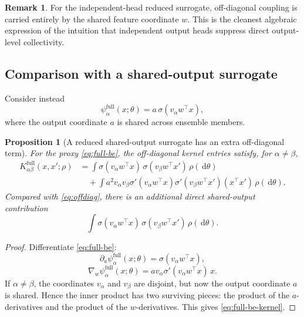 \documentclass[11pt]{article}
\newtheorem{proposition}[theorem]{Proposition}
\theoremstyle{definition}
\newtheorem{remark}[theorem]{Remark}
\newcommand{\dd}{\,\mathrm{d}}
\begin{document}
\begin{remark}
For the independent-head reduced surrogate, off-diagonal coupling is carried entirely by the shared feature coordinate $w$.
This is the cleanest algebraic expression of the intuition that independent output heads suppress direct output-level collectivity.
\end{remark}

\subsection{Comparison with a shared-output surrogate}

Consider instead
\begin{equation}
  \psi_\alpha^{\mathrm{full}}(x;\theta)
  =
  a\, \sigma(v_\alpha w^\top x),
  \label{eq:full-be}
\end{equation}
where the output coordinate $a$ is shared across ensemble members.

\begin{proposition}[A reduced shared-output surrogate has an extra off-diagonal term]
\label{prop:shared-output}
For the proxy \eqref{eq:full-be}, the off-diagonal kernel entries satisfy, for $\alpha\neq\beta$,
\begin{align}
  K^{\mathrm{full}}_{\alpha\beta}(x,x';\rho)
  &=
  \int
  \sigma(v_\alpha w^\top x)\,
  \sigma(v_\beta w^\top x')
  \,\rho(\dd \theta)
  \nonumber\\
  &\quad
  +
  \int
  a^2 v_\alpha v_\beta
  \sigma'(v_\alpha w^\top x)\sigma'(v_\beta w^\top x')
  (x^\top x')
  \,\rho(\dd \theta).
  \label{eq:full-be-kernel}
\end{align}
Compared with \eqref{eq:offdiag}, there is an additional direct shared-output contribution
\[
  \int
  \sigma(v_\alpha w^\top x)\,
  \sigma(v_\beta w^\top x')
  \,\rho(\dd \theta).
\]
\end{proposition}

\begin{proof}
Differentiate \eqref{eq:full-be}:
\[
  \partial_a \psi_\alpha^{\mathrm{full}}(x;\theta)
  =
  \sigma(v_\alpha w^\top x),
\]
\[
  \nabla_w \psi_\alpha^{\mathrm{full}}(x;\theta)
  =
  a v_\alpha \sigma'(v_\alpha w^\top x)\, x.
\]
If $\alpha\neq\beta$, the coordinates $v_\alpha$ and $v_\beta$ are disjoint, but now the output coordinate $a$ is shared.
Hence the inner product has two surviving pieces: the product of the $a$-derivatives and the product of the $w$-derivatives.
This gives \eqref{eq:full-be-kernel}.
\end{proof}
\end{document}
